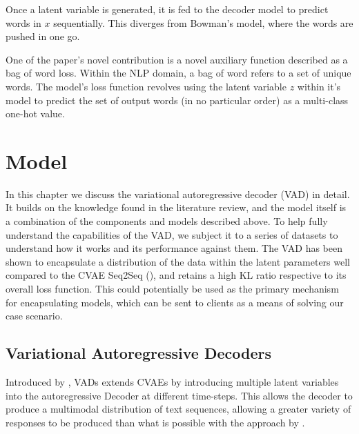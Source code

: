 \documentclass[12pt,twoside]{report}
\begin{document}
Once a latent variable is generated, it is fed to the decoder model to predict words in $x$ sequentially. This diverges from Bowman's model, where the words are pushed in one go.

One of the paper's novel contribution is a novel auxiliary function described as a bag of word loss. Within the NLP domain, a bag of word refers to a set of unique words. The model's loss function revolves using the latent variable $z$ within it's model to predict the set of output words (in no particular order) as a multi-class one-hot value. 

\chapter{Model}


In this chapter we discuss the variational autoregressive decoder (VAD) in detail. It builds on the knowledge found in the literature review, and the model itself is a combination of the components and models described above. To help fully understand the capabilities of the VAD, we subject it to a series of datasets to understand how it works and its performance against them. The VAD has been shown to encapsulate a distribution of the data within the latent parameters well compared to the CVAE Seq2Seq (\cite{zhao_learning_2017}), and retains a high KL ratio respective to its overall loss function. This could potentially be used as the primary mechanism for encapsulating models, which can be sent to clients as a means of solving our case scenario.

\section{Variational Autoregressive Decoders}

Introduced by \cite{du_variational_2018}, VADs extends CVAEs by introducing multiple latent variables into the autoregressive Decoder at different time-steps. This allows the decoder to produce a multimodal distribution of text sequences, allowing a greater variety of responses to be produced than what is possible with the approach by \cite{zhao_learning_2017}.
\end{document}
